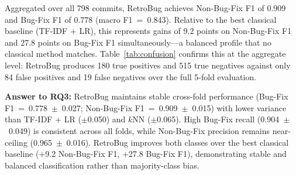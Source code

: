 Aggregated over all 798 commits, RetroBug achieves Non-Bug-Fix F1 of
0.909 and Bug-Fix F1 of 0.778 (macro F1~=~0.843).
Relative to the best classical baseline (TF-IDF + LR), this
represents gains of 9.2 points on Non-Bug-Fix F1 and 27.8 points on
Bug-Fix F1 simultaneously---a balanced profile that no classical
method matches.
Table~\ref{tab:confusion} confirms this at the aggregate level:
RetroBug produces 180 true positives and 515 true negatives against
only 84 false positives and 19 false negatives over the full
5-fold evaluation.



\begin{tcolorbox}[colback=gray!8, colframe=gray!50,
  boxrule=0.5pt, arc=2pt, left=4pt, right=4pt,
  top=3pt, bottom=3pt]
\textbf{Answer to RQ3:}
RetroBug maintains stable cross-fold performance (Bug-Fix
F1~=~0.778~$\pm$~0.027; Non-Bug-Fix F1~=~0.909~$\pm$~0.015) with
lower variance than TF-IDF + LR ($\pm$0.050) and $k$NN ($\pm$0.065).
High Bug-Fix recall (0.904~$\pm$~0.049) is consistent across all
folds, while Non-Bug-Fix precision remains near-ceiling
(0.965~$\pm$~0.016).
RetroBug improves both classes over the best classical baseline
(+9.2 Non-Bug-Fix F1, +27.8 Bug-Fix F1), demonstrating stable and
balanced classification rather than majority-class bias.
\end{tcolorbox}
